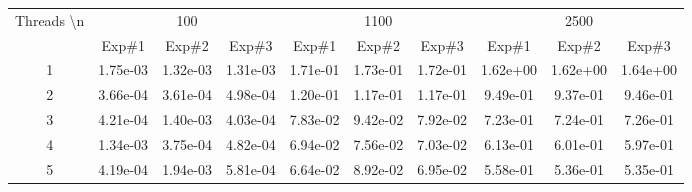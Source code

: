 \newpage
\begin{table}[]
\begin{adjustbox}{angle=90}
\begin{tabular}{|c|ccc|ccc|ccc}
\hline
\multirow{2}{*}{Threads \textbackslash n} & \multicolumn{3}{c|}{100}                                                 & \multicolumn{3}{c|}{1100}                                                & \multicolumn{3}{c|}{2500}                                                                     \\ \cline{2-10} 
                                          & \multicolumn{1}{c|}{Exp\#1}   & \multicolumn{1}{c|}{Exp\#2}   & Exp\#3   & \multicolumn{1}{c|}{Exp\#1}   & \multicolumn{1}{c|}{Exp\#2}   & Exp\#3   & \multicolumn{1}{c|}{Exp\#1}   & \multicolumn{1}{c|}{Exp\#2}   & \multicolumn{1}{c|}{Exp\#3}   \\ \hline
1                                         & \multicolumn{1}{c|}{1.75e-03} & \multicolumn{1}{c|}{1.32e-03} & 1.31e-03 & \multicolumn{1}{c|}{1.71e-01} & \multicolumn{1}{c|}{1.73e-01} & 1.72e-01 & \multicolumn{1}{c|}{1.62e+00} & \multicolumn{1}{c|}{1.62e+00} & \multicolumn{1}{c|}{1.64e+00} \\ \hline
2                                         & \multicolumn{1}{c|}{3.66e-04} & \multicolumn{1}{c|}{3.61e-04} & 4.98e-04 & \multicolumn{1}{c|}{1.20e-01} & \multicolumn{1}{c|}{1.17e-01} & 1.17e-01 & \multicolumn{1}{c|}{9.49e-01} & \multicolumn{1}{c|}{9.37e-01} & \multicolumn{1}{c|}{9.46e-01} \\ \hline
3                                         & \multicolumn{1}{c|}{4.21e-04} & \multicolumn{1}{c|}{1.40e-03} & 4.03e-04 & \multicolumn{1}{c|}{7.83e-02} & \multicolumn{1}{c|}{9.42e-02} & 7.92e-02 & \multicolumn{1}{c|}{7.23e-01} & \multicolumn{1}{c|}{7.24e-01} & \multicolumn{1}{c|}{7.26e-01} \\ \hline
4                                         & \multicolumn{1}{c|}{1.34e-03} & \multicolumn{1}{c|}{3.75e-04} & 4.82e-04 & \multicolumn{1}{c|}{6.94e-02} & \multicolumn{1}{c|}{7.56e-02} & 7.03e-02 & \multicolumn{1}{c|}{6.13e-01} & \multicolumn{1}{c|}{6.01e-01} & \multicolumn{1}{c|}{5.97e-01} \\ \hline
5                                         & \multicolumn{1}{c|}{4.19e-04} & \multicolumn{1}{c|}{1.94e-03} & 5.81e-04 & \multicolumn{1}{c|}{6.64e-02} & \multicolumn{1}{c|}{8.92e-02} & 6.95e-02 & \multicolumn{1}{c|}{5.58e-01} & \multicolumn{1}{c|}{5.36e-01} & \multicolumn{1}{c|}{5.35e-01} \\ \hline

\end{tabular}
\end{adjustbox}
\end{table}
